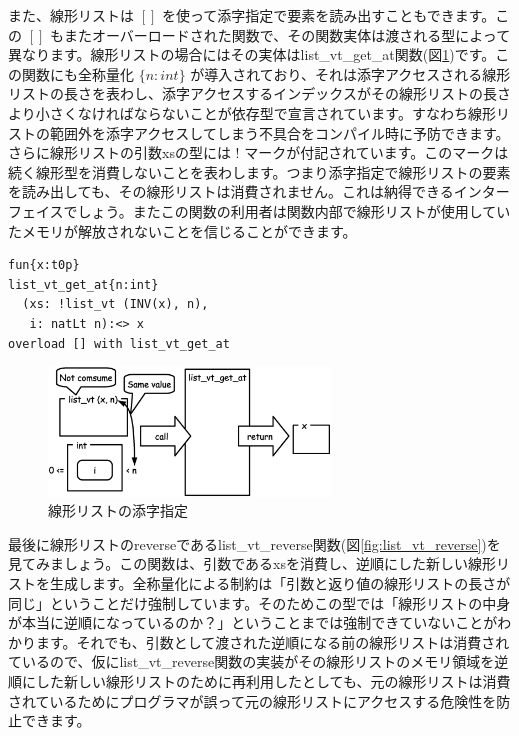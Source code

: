 \documentclass{ipsjprosym}
\begin{document}
また、線形リストは $[]$ を使って添字指定で要素を読み出すこともできます。この $[]$ もまたオーバーロードされた関数で、その関数実体は渡される型によって異なります。線形リストの場合にはその実体はlist\_vt\_get\_at関数(図\ref{fig:list_vt_get_at})です。この関数にも全称量化 $\{n:int\}$ が導入されており、それは添字アクセスされる線形リストの長さを表わし、添字アクセスするインデックスがその線形リストの長さより小さくなければならないことが依存型で宣言されています。すなわち線形リストの範囲外を添字アクセスしてしまう不具合をコンパイル時に予防できます。さらに線形リストの引数xsの型には $!$ マークが付記されています。このマークは続く線形型を消費しないことを表わします。つまり添字指定で線形リストの要素を読み出しても、その線形リストは消費されません。これは納得できるインターフェイスでしょう。またこの関数の利用者は関数内部で線形リストが使用していたメモリが解放されないことを信じることができます。

\vspace{3mm}
\begin{verbatim}
fun{x:t0p}
list_vt_get_at{n:int}
  (xs: !list_vt (INV(x), n),
   i: natLt n):<> x
overload [] with list_vt_get_at
\end{verbatim}
\vspace{3mm}

\begin{figure}[h]
\centering
\includegraphics[width=75mm]{draw/list_vt_get_at.eps}
\caption{線形リストの添字指定}
\label{fig:list_vt_get_at}
\end{figure}

最後に線形リストのreverseであるlist\_vt\_reverse関数(図\ref{fig:list_vt_reverse})を見てみましょう。この関数は、引数であるxsを消費し、逆順にした新しい線形リストを生成します。全称量化による制約は「引数と返り値の線形リストの長さが同じ」ということだけ強制しています。そのためこの型では「線形リストの中身が本当に逆順になっているのか？」ということまでは強制できていないことがわかります。それでも、引数として渡された逆順になる前の線形リストは消費されているので、仮にlist\_vt\_reverse関数の実装がその線形リストのメモリ領域を逆順にした新しい線形リストのために再利用したとしても、元の線形リストは消費されているためにプログラマが誤って元の線形リストにアクセスする危険性を防止できます。
\end{document}
